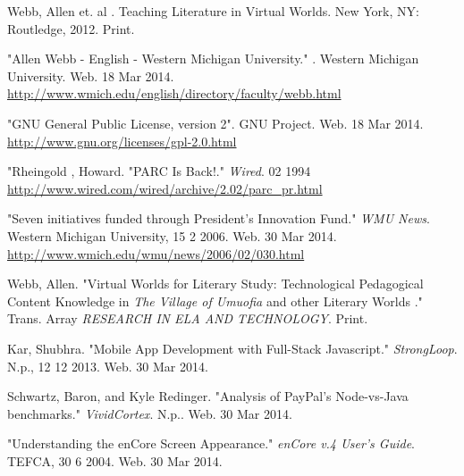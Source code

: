 \documentclass[12pt, letterpaper]{report}
\begin{document}
\printglossary
\begin{thebibliography}{9}

 Webb, Allen et. al . Teaching Literature in Virtual Worlds. New York, NY: Routledge, 2012. Print.

"Allen Webb - English - Western Michigan University." . Western Michigan University. Web. 18 Mar 2014. \\
\url{http://www.wmich.edu/english/directory/faculty/webb.html}

"GNU General Public License, version 2". GNU Project. Web. 18 Mar 2014. \\
\url{http://www.gnu.org/licenses/gpl-2.0.html}


"Rheingold , Howard. "PARC Is Back!." \textit{Wired}. 02 1994 \\
\url{http://www.wired.com/wired/archive/2.02/parc\_pr.html}

"Seven initiatives funded through President's Innovation Fund." \textit{WMU News}. Western Michigan University, 15 2 2006. Web. 30 Mar 2014. \\
\url{http://www.wmich.edu/wmu/news/2006/02/030.html}

Webb, Allen. "Virtual Worlds for Literary Study: Technological Pedagogical Content Knowledge in \textit{The Village of Umuofia} and other Literary Worlds ." Trans. Array \textit{RESEARCH IN ELA AND TECHNOLOGY}. Print.

Kar, Shubhra. "Mobile App Development with Full-Stack Javascript." \textit{StrongLoop}. N.p., 12 12 2013. Web. 30 Mar 2014. \\

Schwartz, Baron, and Kyle Redinger. "Analysis of PayPal's Node-vs-Java benchmarks." \textit{VividCortex}. N.p.. Web. 30 Mar 2014.  \\

"Understanding the enCore Screen Appearance." \textit{enCore v.4 User's Guide}. TEFCA, 30 6 2004. Web. 30 Mar 2014. \\

\end{thebibliography}
	
\end{document}
